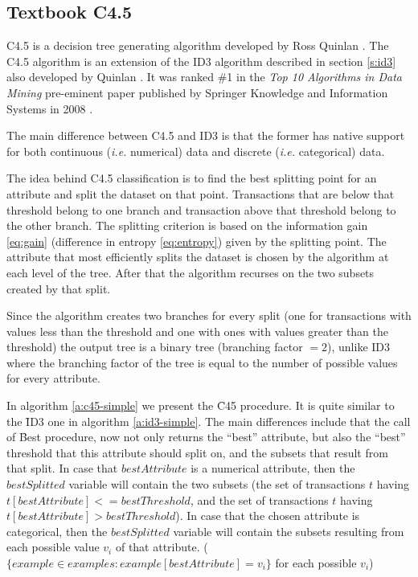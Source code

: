 \subsection{Textbook C4.5}\label{s:c45}
C4.5 is a decision tree generating algorithm developed by Ross Quinlan \cite{quinlan1993c4}.
The C4.5 algorithm is an extension of the ID3 algorithm described in section \ref{s:id3} also developed by Quinlan \cite{quinlan1986induction}.
It was ranked \#1 in the \textit{Top 10 Algorithms in Data Mining} pre\hyp eminent paper published by Springer Knowledge and Information Systems in 2008 \cite{wu2008top}.

The main difference between C4.5 and ID3 is that the former has native support for both continuous (\textit{i.e.} numerical) data and discrete (\textit{i.e.} categorical) data.

The idea behind C4.5 classification is to find the best splitting point for an attribute and split the dataset on that point.
Transactions that are below that threshold belong to one branch and transaction above that threshold belong to the other branch.
The splitting criterion is based on the information gain \ref{eq:gain} (difference in entropy \ref{eq:entropy}) given by the splitting point.
The attribute that most efficiently splits the dataset is chosen by the algorithm at each level of the tree.
After that the algorithm recurses on the two subsets created by that split.

Since the algorithm creates two branches for every split (one for transactions with values less than the threshold and one with ones with values greater than the threshold) the output tree is a binary tree (branching factor $= 2$), unlike ID3 where the branching factor of the tree is equal to the number of possible values for every attribute.

In algorithm \ref{a:c45-simple} we present the \f{C45} procedure.
It is quite similar to the \f{ID3} one in algorithm \ref{a:id3-simple}.
The main differences include that the call of \f{Best} procedure, now not only returns the ``best'' attribute, but also the ``best'' threshold that this attribute should split on, and the subsets that result from that split.
In case that $bestAttribute$ is a numerical attribute, then the $bestSplitted$ variable will contain the two subsets (the set of transactions $t$ having $t[bestAttribute] <= bestThreshold$, and the set of transactions $t$ having $t[bestAttribute] > bestThreshold$).
In case that the chosen attribute is categorical, then the $bestSplitted$ variable will contain the subsets resulting from each possible value $v_i$ of that attribute. ($\{example \in examples : example[bestAttribute] = v_i\}$ for each possible $v_i$)

